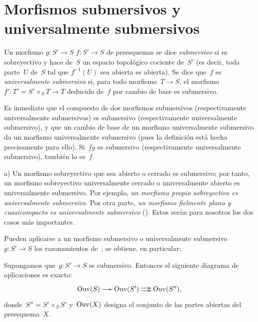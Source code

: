 \section{Morfismos submersivos y universalmente submersivos}
\label{IX.2}

\begin{definition}
\label{IX.2.1}
Un morfismo
{$g\colon S'\to S$}
{$f\colon S'\to S$}
de preesquemas se dice \emph{submersivo}
%
si es sobreyectivo y hace de~$S$ un espacio topológico cociente
de~$S'$ (es decir, toda parte~$U$ de~$S$ tal que $f^{-1}(U)$ sea
abierta es abierta). Se dice que~$f$ es \emph{universalmente
submersivo}
%
si, para todo morfismo~$T\to S$, el morfismo
$f'\colon T'=S'\times_S T\to T$ deducido de~$f$ por cambio de base es
submersivo.
\end{definition}

Es inmediato que el compuesto de dos morfismos submersivos
(respectivamente universalmente submersivos) es submersivo
(respectivamente universalmente submersivo), y que un cambio de base de un
morfismo universalmente submersivo da un morfismo universalmente submersivo
(pues la definición está hecha precisamente para ello). Si~$fg$ es
submersivo (respectivamente universalmente submersivo), también lo es~$f$.

\begin{exemples}
\label{IX.2.2}
a) Un morfismo sobreyectivo que sea abierto o cerrado es submersivo; por
tanto, un morfismo sobreyectivo universalmente cerrado o universalmente
abierto es universalmente submersivo. Por ejemplo, \emph{un morfismo propio
sobreyectivo es universalmente submersivo}. Por otra parte, \emph{un
morfismo fielmente plano y cuasicompacto es universalmente submersivo}
(). Estos serán para nosotros los dos casos más importantes.
\end{exemples}

Pueden aplicarse
a un morfismo submersivo o universalmente submersivo~$g\colon S'\to S$ los
razonamientos de~; se obtiene, en particular:
\begin{proposition}
\label{IX.2.3}
Supongamos que~$g\colon S'\to S$ es submersivo. Entonces el siguiente
diagrama de aplicaciones es exacto:
$$
\xymatrix@C=.5cm{\Ouv (S)\ar[r] &
\Ouv (S')\ar@/^2pt/[r]\ar@/_2pt/[r] & \Ouv(S''),}
$$
donde~$S''=S'\times_S S'$ y~$\operatorname{Ouv}(X)$ designa el conjunto de las partes
abiertas del preesquema~$X$.
\end{proposition}

